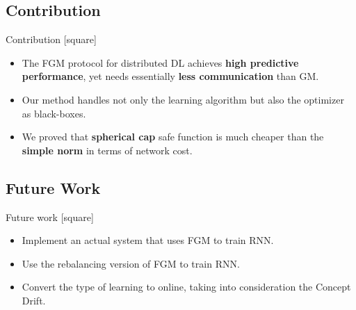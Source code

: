 \subsection{Contribution}\label{subsec:contribution}

\begin{frame}{Contribution}
    [square]
    \begin{itemize}
        \item{The FGM protocol for distributed DL achieves \textbf{high predictive performance}, yet needs
        essentially \textbf{less communication} than GM.}
        \vspace{1cm}
        \item{Our method handles not only the learning algorithm but also the optimizer as black-boxes.}
        \vspace{1cm}
        \item{We proved that \textbf{spherical cap} safe function is much cheaper than the \textbf{simple norm} in terms of network cost.}
    \end{itemize}
\end{frame}

\subsection{Future Work}\label{subsec:future-work}

\begin{frame}{Future work}
    [square]
    \begin{itemize}
        \item{Implement an actual system that uses FGM to train RNN.}
        \vspace{1cm}
        \item{Use the rebalancing version of FGM to train RNN.}
        \vspace{1cm}
        \item{Convert the type of learning to online, taking into consideration the Concept Drift.}
    \end{itemize}
\end{frame}